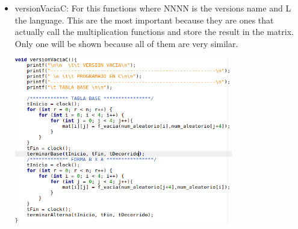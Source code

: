 \documentclass[legalpaper,12pt]{article}
\begin{document}
\begin{itemize}
    \item versionVaciaC: For this functions where NNNN is the versions name and L the language. This are the most important because they are ones that actually call the multiplication functions and store the result in the matrix. Only one will be shown because all of them are very similar.
    \begin{center}{\includegraphics[width=0.75\textwidth]{ejemploVersion.png}\\[1cm]}\end{center}
\end{itemize}
\end{document}
